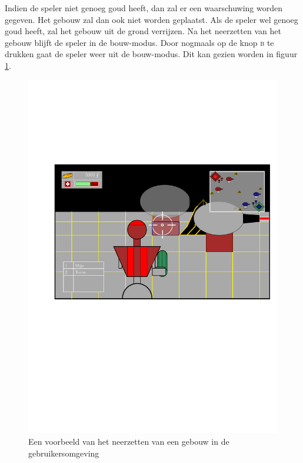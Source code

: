     Indien de speler niet genoeg goud heeft, dan zal er een waarschuwing worden gegeven. Het gebouw zal dan ook niet worden geplaatst. Als de speler wel genoeg goud heeft, zal het gebouw uit de grond verrijzen. Na het neerzetten van het gebouw blijft de speler in de bouw-modus. Door nogmaals op de knop \textsc{b} te drukken gaat de speler weer uit de bouw-modus. Dit kan gezien worden in figuur \ref{fig:gebouw}.
    \begin{figure}
    \centering
    \includegraphics[width=\textwidth]{../Graphics/UI2.pdf}
    \caption{Een voorbeeld van het neerzetten van een gebouw in de gebruikersomgeving}
    \label{fig:gebouw}
    \end{figure} 